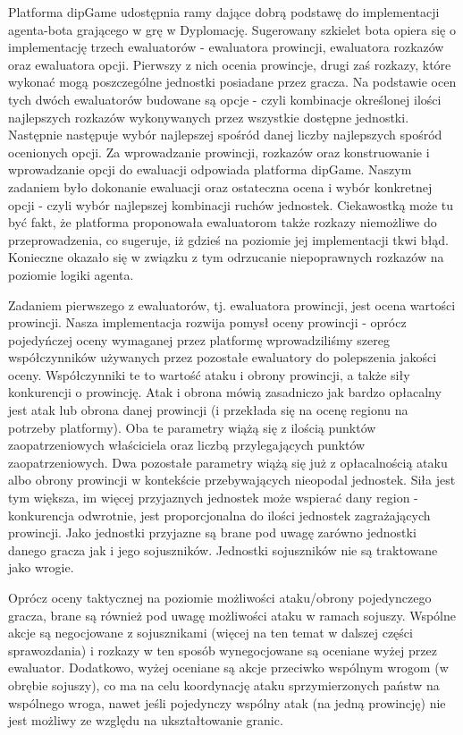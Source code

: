 Platforma dipGame udostępnia ramy dające dobrą podstawę do implementacji agenta-bota grającego w grę w Dyplomację. Sugerowany szkielet bota opiera się o implementację trzech ewaluatorów - ewaluatora prowincji, ewaluatora rozkazów oraz ewaluatora opcji. Pierwszy z nich ocenia prowincje, drugi zaś rozkazy, które wykonać mogą poszczególne jednostki posiadane przez gracza. Na podstawie ocen tych dwóch ewaluatorów budowane są opcje - czyli kombinacje określonej ilości najlepszych rozkazów wykonywanych przez wszystkie dostępne jednostki. Następnie następuje wybór najlepszej spośród danej liczby najlepszych spośród ocenionych opcji. Za wprowadzanie prowincji, rozkazów oraz konstruowanie i wprowadzanie opcji do ewaluacji odpowiada platforma dipGame. Naszym zadaniem było dokonanie ewaluacji oraz ostateczna ocena i wybór konkretnej opcji - czyli wybór najlepszej kombinacji ruchów jednostek. Ciekawostką może tu być fakt, że platforma proponowała ewaluatorom także rozkazy niemożliwe do przeprowadzenia, co sugeruje, iż gdzieś na poziomie jej implementacji tkwi błąd. Konieczne okazało się w związku z tym odrzucanie niepoprawnych rozkazów na poziomie logiki agenta.

    Zadaniem pierwszego z ewaluatorów, tj. ewaluatora prowincji, jest ocena wartości prowincji. Nasza implementacja rozwija pomysł oceny prowincji - oprócz pojedyńczej oceny wymaganej przez platformę wprowadziliśmy szereg współczynników używanych przez pozostałe ewaluatory do polepszenia jakości oceny. Współczynniki te to wartość ataku i obrony prowincji, a także siły  konkurencji o prowincję. Atak i obrona mówią zasadniczo jak bardzo opłacalny jest atak lub obrona danej prowincji (i przekłada się na ocenę regionu na potrzeby platformy). Oba te parametry wiążą się z ilością punktów zaopatrzeniowych właściciela oraz liczbą przylegających punktów zaopatrzeniowych. Dwa pozostałe parametry wiążą się już z opłacalnością ataku albo obrony prowincji w kontekście przebywających nieopodal jednostek. Siła jest tym większa, im więcej przyjaznych jednostek może wspierać dany region - konkurencja odwrotnie, jest proporcjonalna do ilości jednostek zagrażających prowincji. Jako jednostki przyjazne są brane pod uwagę zarówno jednostki danego gracza jak i jego sojuszników. Jednostki sojuszników nie są traktowane jako wrogie.

	Oprócz oceny taktycznej na poziomie możliwości ataku/obrony pojedynczego gracza, brane są również pod uwagę możliwości ataku w ramach sojuszy. Wspólne akcje są negocjowane z sojusznikami (więcej na ten temat w dalszej części sprawozdania)  i rozkazy w ten sposób wynegocjowane są oceniane wyżej przez ewaluator. Dodatkowo, wyżej oceniane są akcje przeciwko wspólnym wrogom (w obrębie sojuszy), co ma na celu koordynację ataku sprzymierzonych państw na wspólnego wroga, nawet jeśli pojedynczy wspólny atak (na jedną prowincję) nie jest możliwy ze względu na ukształtowanie granic.

